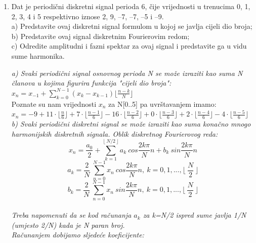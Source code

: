 \documentclass[12pt]{article}
\begin{document}
    
	\begin{enumerate}
	\item Dat je periodični diskretni signal perioda 6, čije vrijednosti u trenucima 0, 1, 2, 3, 4 i 5 respektivno iznose 2, 9, –7, –7, –5 i –9.\\
a) Predstavite ovaj diskretni signal formulom u kojoj se javlja cijeli dio broja;\\
b) Predstavite ovaj signal diskretnim Fourierovim redom;\\
c) Odredite amplitudni i fazni spektar za ovaj signal i predstavite ga u vidu sume harmonika.\\
\begin{center}
    \textit{a) Svaki periodični signal osnovnog perioda N se može izraziti kao suma N članova u kojima figurira funkcija "cijeli dio broja":\\
$x_n = x_{-1} + \sum^{N-1}_{k=0} (x_k - x_{k-1}) \lfloor\frac{n-k}{N}\rfloor$}\\
Poznate su nam vrijednosti $x_n$ za N[0..5] pa uvrštavanjem imamo:\\
\underline{$x_n = -9 + 11\cdot \lfloor\frac{n}{6}\rfloor + 7 \cdot \lfloor\frac{n-1}{6}\rfloor -16 \cdot \lfloor\frac{n-2}{6}\rfloor + 0 \cdot \lfloor\frac{n-3}{6}\rfloor + 2 \cdot \lfloor\frac{n-4}{6}\rfloor - 4 \cdot \lfloor\frac{n-5}{6}\rfloor$}\\
\vspace{0.25cm}
\textit{b) Svaki periodični diskretni signal se može izraziti kao suma konačno mnogo harmonijskih diskretnih signala. Oblik diskretnog Fourierovog reda:\\
\begin{equation*}
		    x_n = \frac{a_0}{2} + \sum_{k = 1}^{\lfloor~N/2~\rfloor} a_k~cos\frac{2k\pi}{N}n + b_k~sin\frac{2k\pi}{N}n
		\end{equation*}
		\begin{equation*}
		    a_k = \frac{2}{N}~\sum_{n = 0}^{N - 1} x_n~cos\frac{2k\pi}{N}n, ~ k = 0,1,...,\lfloor~\frac{N}{2}~\rfloor
		\end{equation*}
		\begin{equation*}
		    b_k = \frac{2}{N}~\sum_{n = 0}^{N - 1} x_n~sin\frac{2k\pi}{N}n, ~ k = 0,1,...,\lfloor~\frac{N}{2}~\rfloor
		\end{equation*}\\
Treba napomenuti da se kod računanja $a_k$ za k=N/2 ispred sume javlja 1/N (umjesto 2/N) kada je N paran broj.	\\ Računanjem dobijamo sljedeće koeficijente:\\	
}
\end{center}
\end{enumerate}
\end{document}
